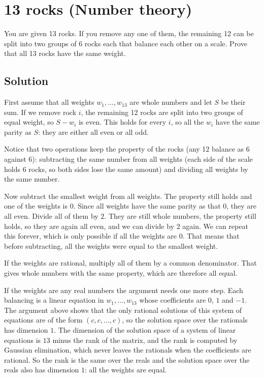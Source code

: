 \section {13 rocks (Number theory)}

You are given 13 rocks. If you remove any one of them, the remaining 12 can be split
into two groups of 6 rocks each that balance each other on a scale.
Prove that all 13 rocks have the same weight.

\subsection{Solution}

First assume that all weights $w_1, \ldots, w_{13}$ are whole numbers and let $S$ be their sum.
If we remove rock $i$, the remaining 12 rocks are split into two groups of equal weight, so $S-w_i$ is even.
This holds for every $i$, so all the $w_i$ have the same parity as $S$: they are either all even or all odd.

Notice that two operations keep the property of the rocks (any 12 balance as 6 against 6):
subtracting the same number from all weights (each side of the scale holds 6 rocks, so both sides lose the same amount)
and dividing all weights by the same number.

Now subtract the smallest weight from all weights. The property still holds and one of the weights is $0$.
Since all weights have the same parity as that $0$, they are all even.
Divide all of them by $2$. They are still whole numbers, the property still holds, so they are again all even, and we can divide by $2$ again.
We can repeat this forever, which is only possible if all the weights are $0$.
That means that before subtracting, all the weights were equal to the smallest weight.

If the weights are rational, multiply all of them by a common denominator. That gives whole numbers with the same property, which are therefore all equal.

If the weights are any real numbers the argument needs one more step.
Each balancing is a linear equation in $w_1, \ldots, w_{13}$ whose coefficients are $0$, $1$ and $-1$.
The argument above shows that the only rational solutions of this system of equations are of the form $(c, c, \ldots, c)$,
so the solution space over the rationals has dimension $1$.
The dimension of the solution space of a system of linear equations is $13$ minus the rank of the matrix, and the rank
is computed by Gaussian elimination, which never leaves the rationals when the coefficients are rational.
So the rank is the same over the reals and the solution space over the reals also has dimension $1$: all the weights are equal.
